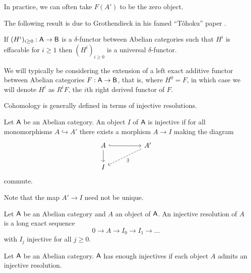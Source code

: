 \begin{remark}
    In practice, we can often take $F(A')$ to be the zero object. 
\end{remark}
The following result is due to Grothendieck in his famed ``T\^{o}hoku'' paper \cite{Tohoku}. 
\begin{theorem}[Grothendieck]\label{thm: Grothendieck tohoku effacable implies universal}
    If $(H^{i})_{i\geq0}:\mathsf{A}\to\mathsf{B}$ is a $\delta$-functor between Abelian categories such that $H^{i}$ is effacable for $i\geq 1$ then $(H^{i})_{i\geq0}$ is a universal $\delta$-functor. 
\end{theorem}
\begin{remark}
    We will typically be considering the extension of a left exact additive functor between Abelian categories $F:\mathsf{A}\to\mathsf{B}$, that is, where $H^{0}=F$, in which case we will denote $H^{i}$ as $R^{i}F$, the $i$th right derived functor of $F$. 
\end{remark}
Cohomology is generally defined in terms of injective resolutions. 
\begin{definition}\label{def: injective object}
    Let $\mathsf{A}$ be an Abelian category. An object $I$ of $\mathsf{A}$ is injective if for all monomorphisms $A\hookrightarrow A'$ there exists a morphism $A\to I$ making the diagram 
    $$%
    \begin{tikzcd}
        A && {A'} \\
        I
        \arrow[hook, from=1-1, to=1-3]
        \arrow[from=1-1, to=2-1]
        \arrow["\exists", dashed, from=1-3, to=2-1]
    \end{tikzcd}$$
    commute. 
\end{definition}
\begin{remark}
    Note that the map $A'\to I$ need not be unique. 
\end{remark}
\begin{definition}\label{def: injective resolutions}
    Let $\mathsf{A}$ be an Abelian category and $A$ an object of $\mathsf{A}$. An injective resolution of $A$ is a long exact sequence 
    $$0\to A\to I_{0}\to I_{1}\to\dots$$
    with $I_{j}$ injective for all $j\geq0$. 
\end{definition}
\begin{definition}\label{def: enough injectives}
    Let $\mathsf{A}$ be an Abelian category. $\mathsf{A}$ has enough injectives if each object $A$ admits an injective resolution. 
\end{definition}
